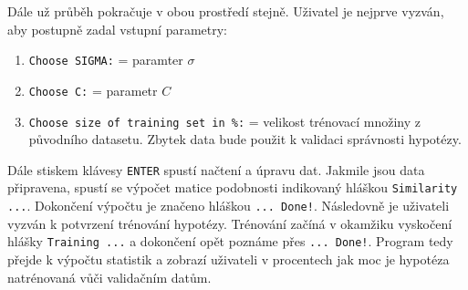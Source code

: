 \documentclass[a4]{article}
\begin{document}
\noindent Dále už průběh pokračuje v obou prostředí stejně. Uživatel je nejprve vyzván, aby postupně zadal vstupní parametry:

\begin{enumerate}
	\item \texttt{Choose SIGMA:} = paramter $\sigma$
	\item \texttt{Choose C:} = parametr $C$
	\item \texttt{Choose size of training set in \%:} = velikost trénovací množiny z původního datasetu. Zbytek data bude použit k validaci správnosti hypotézy.
\end{enumerate}

\noindent Dále stiskem klávesy \texttt{ENTER} spustí načtení a úpravu dat. Jakmile jsou data připravena, spustí se výpočet matice podobnosti indikovaný hláškou \texttt{Similarity ...}. Dokončení výpočtu je značeno hláškou \texttt{... Done!}. Následovně je uživateli vyzván k potvrzení trénování hypotézy. Trénování začíná v okamžiku vyskočení hlášky \texttt{Training ...} a dokončení opět poznáme přes \texttt{... Done!}. Program tedy přejde k výpočtu statistik a zobrazí uživateli v procentech jak moc je hypotéza natrénovaná vůči validačním datům.
\end{document}
